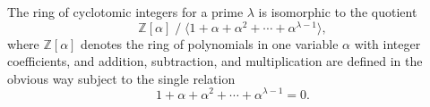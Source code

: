 The ring of cyclotomic integers for a prime $\lambda$ is isomorphic to the quotient
$$\mathbb{Z}[\alpha] \;\big/\; \langle 1 + \alpha + \alpha^2 + \cdots + \alpha^{\lambda-1} \rangle,$$
where $\mathbb{Z}[\alpha]$ denotes the ring of polynomials in one variable $\alpha$ with integer coefficients, and addition, subtraction, and multiplication are defined in the obvious way subject to the single relation
$$1 + \alpha + \alpha^2 + \cdots + \alpha^{\lambda-1} = 0.$$
